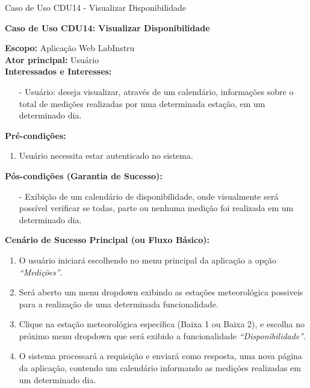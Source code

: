 \begin{quadro}[H]
	\centering
	\caption{Caso de Uso CDU14 - Visualizar Disponibilidade}

	\begin{framed}

		\textbf{Caso de Uso CDU14: Visualizar Disponibilidade}\\

		\begin{flushleft}

		\textbf{Escopo:} Aplicação Web LabInstru\\

		\textbf{Ator principal:} Usuário\\

		\textbf{Interessados e Interesses:}
		\begin{itemize}
			\item[-] Usuário: deseja visualizar, através de um calendário, informações sobre o total de medições realizadas por uma determinada estação, em um determinado dia.
		\end{itemize}

		\textbf{Pré-condições:}\\
			 \begin{enumerate}
			 	\item{Usuário necessita estar autenticado no sistema.}
			 \end{enumerate}

		\textbf{Pós-condições (Garantia de Sucesso):}
		\begin{itemize}
			\item[-] Exibição de um calendário de disponibilidade, onde visualmente será possível verificar se todas, parte ou nenhuma medição foi realizada em um determinado dia.
		\end{itemize}

		\textbf{Cenário de Sucesso Principal (ou Fluxo Básico):}
			\begin{enumerate}
				\item{O usuário iniciará escolhendo no menu principal da aplicação a opção \textit{``Medições''}.}
				\item{Será aberto um menu dropdown exibindo as estações meteorológica possiveis para a realização de uma determinada funcionalidade.}
				\item{Clique na estação meteorológica específica (Baixa 1 ou Baixa 2), e escolha no próximo menu dropdown que será exibido a funcionalidade \textit{``Disponibilidade''}.}
				\item{O sistema processará a requisição e enviará como resposta, uma nova página da aplicação, contendo um calendário informando as medições realizadas em um determinado dia.}
			 \end{enumerate}


\end{flushleft}
\end{framed}
\end{quadro}
